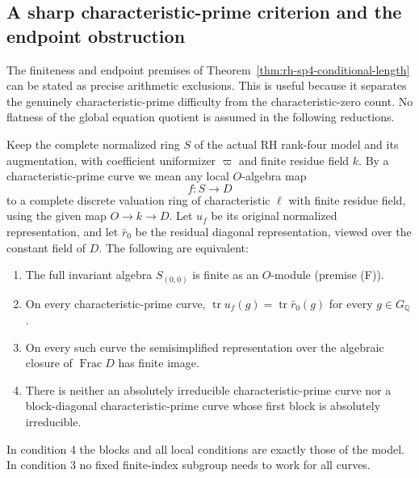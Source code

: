 \subsection{A sharp characteristic-prime criterion and the endpoint obstruction}
\label{sec:rh-sp4-curve-frontier}

The finiteness and endpoint premises of
Theorem~\ref{thm:rh-sp4-conditional-length} can be stated
as precise arithmetic exclusions. This is useful because it
separates the genuinely characteristic-prime difficulty
from the characteristic-zero count. No flatness of the
global equation quotient is assumed in the following
reductions.

\begin{theorem}
\label{thm:rh-sp4-curve-criterion}
Keep the complete normalized ring \(S\) of the actual RH
rank-four model and its augmentation, with coefficient
uniformizer \(\varpi\) and finite residue field \(k\).
By a characteristic-prime curve we mean any local
\(O\)-algebra map
\[
                  f:S\longrightarrow D
\]
to a complete discrete valuation ring of characteristic
\(\ell\) with finite residue field, using the given
map \(O\to k\to D\). Let \(u_f\) be its original
normalized representation, and let \(\bar r_0\) be the
residual diagonal representation, viewed over the constant
field of \(D\). The following are equivalent:
\begin{enumerate}
\item The full invariant algebra \(S_{(0,0)}\) is finite
as an \(O\)-module (premise (F)).
\item On every characteristic-prime curve,
\(\operatorname{tr}u_f(g)=\operatorname{tr}\bar r_0(g)\)
for every \(g\in G_{\mathbb Q}\).
\item On every such curve the semisimplified representation
over the algebraic closure of \(\operatorname{Frac}D\)
has finite image.
\item There is neither an absolutely irreducible
characteristic-prime curve nor a block-diagonal
characteristic-prime curve whose first block is
absolutely irreducible.
\end{enumerate}
In condition 4 the blocks and all local conditions are
exactly those of the model. In condition 3 no fixed
finite-index subgroup needs to work for all curves.
\end{theorem}

